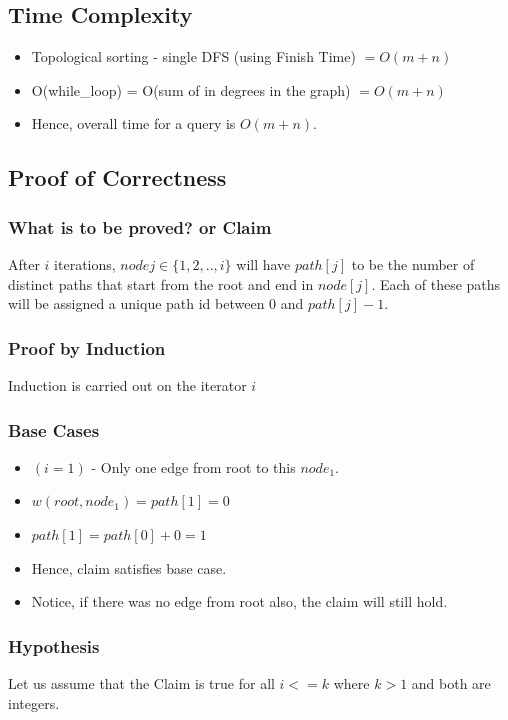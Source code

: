 \documentclass{article}
\begin{document}
\subsection{Time Complexity}
\begin{itemize}
\item Topological sorting - single DFS (using Finish Time) $= O(m+n)$
\item O(while\_loop) = O(sum of in degrees in the graph) $= O(m+n)$
\item Hence, overall time for a query is $O(m+n)$. 
\end{itemize}
\subsection{Proof of Correctness}
\subsubsection{What is to be proved? or Claim}
After $i$ iterations, $node j \in \{1,2,..,i\}$ will have $path[j]$ to be the number of distinct paths that start from the root and end in $node[j]$. Each of these paths will be assigned a unique path id between $0$ and $path[j]-1$.  
\subsubsection{Proof by Induction}
Induction is carried out on the iterator $i$
\subsubsection{Base Cases}
\begin{itemize}
\item $(i=1)$ - Only one edge from root to this $node_1$. 
\item $w(root,node_1) = path[1] = 0$  
\item $path[1] = path[0] + 0 = 1$
\item Hence, claim satisfies base case.
\item Notice, if there was no edge from root also, the claim will still hold.
\end{itemize}
\subsubsection{Hypothesis}
Let us assume that the Claim is true for all $i<=k$ where $k>1$ and both are integers.
\end{document}
